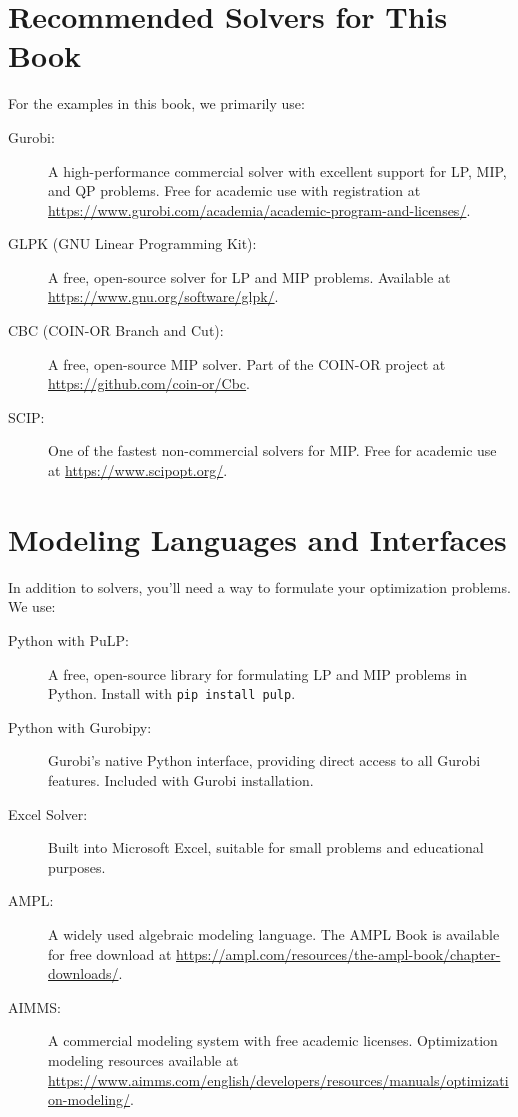 \section{Recommended Solvers for This Book}

For the examples in this book, we primarily use:

\begin{description}
\item[Gurobi:] A high-performance commercial solver with excellent support for LP, MIP, and QP problems. Free for academic use with registration at \url{https://www.gurobi.com/academia/academic-program-and-licenses/}.

\item[GLPK (GNU Linear Programming Kit):] A free, open-source solver for LP and MIP problems. Available at \url{https://www.gnu.org/software/glpk/}.

\item[CBC (COIN-OR Branch and Cut):] A free, open-source MIP solver. Part of the COIN-OR project at \url{https://github.com/coin-or/Cbc}.

\item[SCIP:] One of the fastest non-commercial solvers for MIP. Free for academic use at \url{https://www.scipopt.org/}.
\end{description}

\section{Modeling Languages and Interfaces}

In addition to solvers, you'll need a way to formulate your optimization problems. We use:

\begin{description}
\item[Python with PuLP:] A free, open-source library for formulating LP and MIP problems in Python. Install with \texttt{pip install pulp}.

\item[Python with Gurobipy:] Gurobi's native Python interface, providing direct access to all Gurobi features. Included with Gurobi installation.

\item[Excel Solver:] Built into Microsoft Excel, suitable for small problems and educational purposes.

\item[AMPL:] A widely used algebraic modeling language. The AMPL Book is available for free download at \url{https://ampl.com/resources/the-ampl-book/chapter-downloads/}.

\item[AIMMS:] A commercial modeling system with free academic licenses. Optimization modeling resources available at \url{https://www.aimms.com/english/developers/resources/manuals/optimization-modeling/}.
\end{description}

